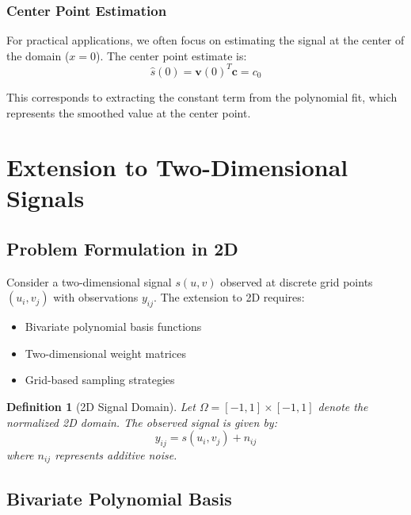 \documentclass[12pt]{article}
\renewcommand{\vec}[1]{\mathbf{#1}}
\newtheorem{definition}[theorem]{Definition}
\begin{document}
\subsubsection{Center Point Estimation}

For practical applications, we often focus on estimating the signal at the center of the domain ($x = 0$). The center point estimate is:
\begin{equation}
    \hat{s}(0) = \vec{v}(0)^T \vec{c} = c_0
\end{equation}

This corresponds to extracting the constant term from the polynomial fit, which represents the smoothed value at the center point.

\newpage

\section{Extension to Two-Dimensional Signals}

\subsection{Problem Formulation in 2D}

Consider a two-dimensional signal $s(u, v)$ observed at discrete grid points $(u_i, v_j)$ with observations $y_{ij}$. The extension to 2D requires:

\begin{itemize}
    \item Bivariate polynomial basis functions
    \item Two-dimensional weight matrices
    \item Grid-based sampling strategies
\end{itemize}

\begin{definition}[2D Signal Domain]
    Let $\Omega = [-1, 1] \times [-1, 1]$ denote the normalized 2D domain. The observed signal is given by:
    \begin{equation}
        y_{ij} = s(u_i, v_j) + n_{ij}
    \end{equation}
    where $n_{ij}$ represents additive noise.
\end{definition}

\subsection{Bivariate Polynomial Basis}
\end{document}
